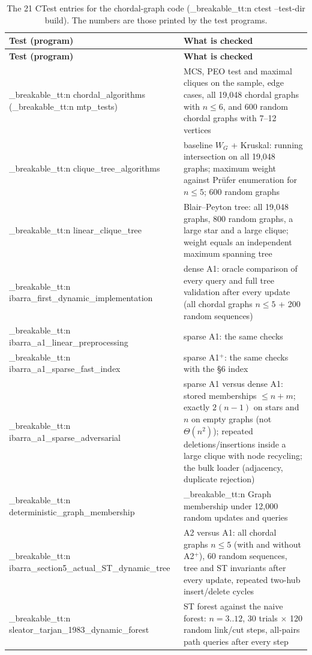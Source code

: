 \documentclass[11pt,a4paper,oneside]{report}
\theoremstyle{plain}
\theoremstyle{definition}
\theoremstyle{remark}
\DeclareRobustCommand{\code}[1]{\mtp_breakable_tt:n {#1}}
\begin{document}
\begin{longtable}{@{}>{\raggedright\arraybackslash}p{}>{\raggedright\arraybackslash}p{}@{}}
\caption[The CTest suite]{The 21 CTest entries for the chordal-graph code (\code{ctest --test-dir build}). The numbers
are those printed by the test programs.}\label{tab:tests}\\
\toprule
\textbf{Test (program)} & \textbf{What is checked}\\
\midrule
\endfirsthead
\toprule
\textbf{Test (program)} & \textbf{What is checked}\\
\midrule
\endhead
\bottomrule
\endfoot
\code{chordal_algorithms} (\code{mtp_tests}) & MCS, PEO test and maximal cliques on the sample, edge cases, all 19{,}048 chordal graphs with \(n\le6\), and 600 random chordal graphs with 7--12 vertices\\
\code{clique_tree_algorithms} & baseline \(W_G\) + Kruskal: running intersection on all 19{,}048 graphs; maximum weight against Prüfer enumeration for \(n\le5\); 600 random graphs\\
\code{linear_clique_tree} & Blair--Peyton tree: all 19{,}048 graphs, 800 random graphs, a large star and a large clique; weight equals an independent maximum spanning tree\\
\code{ibarra_first_dynamic_implementation} & dense A1: oracle comparison of every query and full tree validation after every update (all chordal graphs \(n\le5\) + 200 random sequences)\\
\code{ibarra_a1_linear_preprocessing} & sparse A1: the same checks\\
\code{ibarra_a1_sparse_fast_index} & sparse A1\(^+\): the same checks with the \S6 index\\
\code{ibarra_a1_sparse_adversarial} & sparse A1 versus dense A1: stored memberships \(\le n+m\); exactly \(2(n-1)\) on stars and \(n\) on empty graphs (not \(\Theta(n^2)\)); repeated deletions/insertions inside a large clique with node recycling; the bulk loader (adjacency, duplicate rejection)\\
\code{deterministic_graph_membership} & \code{Graph} membership under 12{,}000 random updates and queries\\
\code{ibarra_section5_actual_ST_dynamic_tree} & A2 versus A1: all chordal graphs \(n\le5\) (with and without A2\(^+\)), 60 random sequences, tree and ST invariants after every update, repeated two-hub insert/delete cycles\\
\code{sleator_tarjan_1983_dynamic_forest} & ST forest against the naive forest: \(n=3..12\), 30 trials \(\times\) 120 random link/cut steps, all-pairs path queries after every step\\

\end{longtable}
\end{document}
